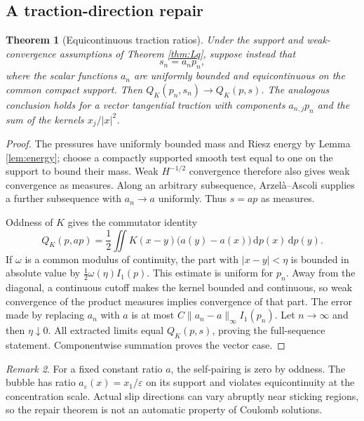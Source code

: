 \documentclass[11pt,a4paper]{article}
\newtheorem{theorem}{Theorem}[section]
\theoremstyle{definition}\newtheorem{definition}[theorem]{Definition}
\theoremstyle{remark}\newtheorem{remark}[theorem]{Remark}
\newcommand{\dd}{\,\mathrm d}
\newcommand{\norm}[1]{\lVert #1\rVert}
\numberwithin{equation}{section}
\begin{document}
\subsection{A traction-direction repair}
\begin{theorem}[Equicontinuous traction ratios]\label{thm:ratio}
Under the support and weak-convergence assumptions of Theorem \ref{thm:Lq}, suppose instead that
\[
 s_n=a_n p_n,
\]
where the scalar functions $a_n$ are uniformly bounded and equicontinuous on the common compact support. Then $Q_K(p_n,s_n)\to Q_K(p,s)$. The analogous conclusion holds for a vector tangential traction with components $a_{n,j}p_n$ and the sum of the kernels $x_j/|x|^2$.
\end{theorem}
\begin{proof}
The pressures have uniformly bounded mass and Riesz energy by Lemma \ref{lem:energy}; choose a compactly supported smooth test equal to one on the support to bound their mass. Weak $H^{-1/2}$ convergence therefore also gives weak convergence as measures. Along an arbitrary subsequence, Arzel\`a--Ascoli supplies a further subsequence with $a_n\to a$ uniformly. Thus $s=ap$ as measures.

Oddness of $K$ gives the commutator identity
\begin{equation}\label{eq:commutator}
 Q_K(p,ap)=\frac12\iint K(x-y)\bigl(a(y)-a(x)\bigr)\dd p(x)\dd p(y).
\end{equation}
If $\omega$ is a common modulus of continuity, the part with $|x-y|<\eta$ is bounded in absolute value by
$\tfrac12\omega(\eta) I_1(p)$. This estimate is uniform for $p_n$. Away from the diagonal, a continuous cutoff makes the kernel bounded and continuous, so weak convergence of the product measures implies convergence of that part. The error made by replacing $a_n$ with $a$ is at most
$C\norm{a_n-a}_\infty I_1(p_n)$.
Let $n\to\infty$ and then $\eta\downarrow0$. All extracted limits equal $Q_K(p,s)$, proving the full-sequence statement. Componentwise summation proves the vector case.
\end{proof}

\begin{remark}
For a fixed constant ratio $a$, the self-pairing is zero by oddness. The bubble has ratio $a_\varepsilon(x)=x_1/\varepsilon$ on its support and violates equicontinuity at the concentration scale. Actual slip directions can vary abruptly near sticking regions, so the repair theorem is not an automatic property of Coulomb solutions.
\end{remark}
\end{document}
